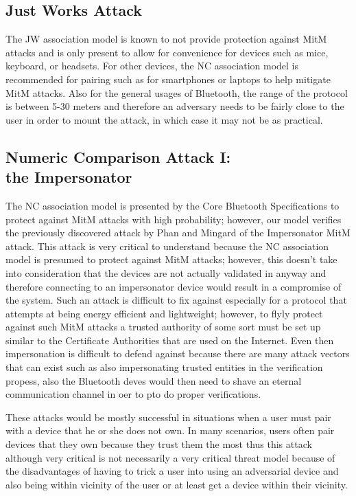 \documentclass{acm_proc_article-sp}
\begin{document}
\subsection{Just Works Attack}
The JW association model is known to not provide protection against MitM attacks and is only present to allow for convenience for devices such as mice, keyboard, or headsets. For other devices, the NC association model is recommended for pairing such as for smartphones or laptops to help mitigate MitM attacks. Also for the general usages of Bluetooth, the range of the protocol is between 5-30 meters and therefore an adversary needs to be fairly close to the user in order to mount the attack, in which case it may not be as practical.

\subsection{Numeric Comparison Attack I:\\the Impersonator}
The NC association model is presented by the Core Bluetooth Specifications to protect against MitM attacks with high probability; however, our model verifies the previously discovered attack by Phan and Mingard \cite{phan:mingard} of the Impersonator MitM attack. This attack is very critical to understand because the NC association model is presumed to protect against MitM attacks; however, this doesn't take into consideration that the devices are not actually validated in anyway and therefore connecting to an impersonator device would result in a compromise of the system. Such an attack is difficult to fix against especially for a protocol that attempts at being energy efficient and lightweight; however, to flyly protect against such MitM attacks a trusted authority of some sort must be set up similar to the Certificate Authorities that are used on the Internet. Even then impersonation is difficult to defend against because there are many attack vectors that can exist such as also impersonating trusted entities in the verification propess, also the Bluetooth deves would then need to shave an eternal communication channel in oer to pto do proper verifications.

These attacks would be mostly successful in situations when a user must pair with a device that he or she does not own. In many scenarios, users often pair devices that they own because they trust them the most thus this attack although very critical is not necessarily a very critical threat model because of the disadvantages of having to trick a user into using an adversarial device and also being within vicinity of the user or at least get a device within their vicinity.
\end{document}
